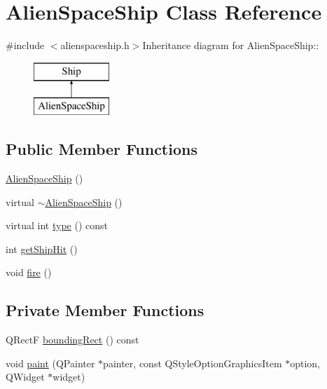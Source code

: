 \hypertarget{class_alien_space_ship}{
\section{AlienSpaceShip Class Reference}
\label{class_alien_space_ship}
}


{\ttfamily \#include $<$alienspaceship.h$>$}Inheritance diagram for AlienSpaceShip::\begin{figure}[H]
\begin{center}
\leavevmode
\includegraphics[height=2cm]{class_alien_space_ship}
\end{center}
\end{figure}
\subsection*{Public Member Functions}
\begin{DoxyCompactItemize}
\item 
\hyperlink{class_alien_space_ship_a09dfa4a07e14e135b09acd168f42db7c}{AlienSpaceShip} ()
\item 
virtual \hyperlink{class_alien_space_ship_a4d3f300898239370f3daa688aa16f801}{$\sim$AlienSpaceShip} ()
\item 
virtual int \hyperlink{class_alien_space_ship_aabf0179043ef296560f15e88d4da386c}{type} () const 
\item 
int \hyperlink{class_alien_space_ship_ab6ff56db6d322e2023611315e53c4895}{getShipHit} ()
\item 
void \hyperlink{class_alien_space_ship_a311238821e190e2198cfed6cc956e4c8}{fire} ()
\end{DoxyCompactItemize}
\subsection*{Private Member Functions}
\begin{DoxyCompactItemize}
\item 
QRectF \hyperlink{class_alien_space_ship_ab99ad296ecc69ab1b84bf692eaeb775e}{boundingRect} () const 
\item 
void \hyperlink{class_alien_space_ship_a463eea8a3dfe340539766da746e168b5}{paint} (QPainter $\ast$painter, const QStyleOptionGraphicsItem $\ast$option, QWidget $\ast$widget)
\end{DoxyCompactItemize}
